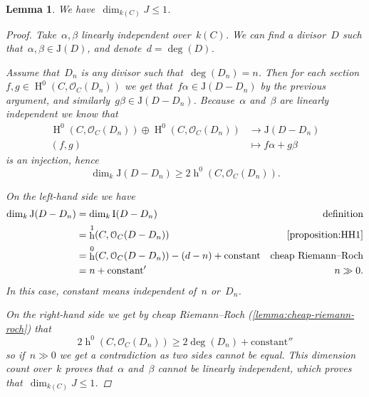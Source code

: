 \documentclass[10pt,a4paper]{article}
\theoremstyle{lecture}
\newtheorem{lemma}[theorem]{Lemma}
\DeclareMathOperator\hh{h}
\DeclareMathOperator\HH{H}
\begin{document}
\begin{lemma}
  \label{lemma:dim(J)<=1}
  We have~$\dim_{k(C)}J\leq 1$.
  \begin{proof}
    Take~$\alpha,\beta$ linearly independent over~$k(C)$. We can find a divisor~$D$ such that~$\alpha,\beta\in\mathrm{J}(D)$, and denote~$d=\deg(D)$.

    Assume that~$D_n$ is any divisor such that~$\deg(D_n)=n$. Then for each section $f,g\in\HH^0(C,\mathcal{O}_C(D_n))$ we get that~$f\alpha\in\mathrm{J}(D-D_n)$ by the previous argument, and similarly~$g\beta\in\mathrm{J}(D-D_n)$. Because~$\alpha$ and~$\beta$ are linearly independent we know that
    \begin{equation}
      \begin{aligned}
        \HH^0(C,\mathcal{O}_C(D_n))\oplus\HH^0(C,\mathcal{O}_C(D_n))&\to\mathrm{J}(D-D_n) \\
        (f,g)&\mapsto f\alpha+g\beta
      \end{aligned}
    \end{equation}
    is an injection, hence
    \begin{equation}
      \dim_k\mathrm{J}(D-D_n)\geq 2\hh^0(C,\mathcal{O}_C(D_n)).
    \end{equation}

    On the left-hand side we have
    \begin{equation}
      \begin{aligned}
        \dim_k\mathrm{J}(D-D_n)&=\dim_k\mathrm{I}(D-D_n) & \text{definition} \\
        &=\hh^1(C,\mathcal{O}_C(D-D_n)) & \text{\cref{proposition:HH1}} \\
        &=\hh^0(C,\mathcal{O}_C(D-D_n))-(d-n)+\text{constant} & \text{cheap Riemann--Roch} \\
        &=n+\text{constant}' & n\gg 0.
      \end{aligned}
    \end{equation}
    In this case, constant means independent of~$n$ or~$D_n$.

    On the right-hand side we get by cheap Riemann--Roch (\cref{lemma:cheap-riemann-roch}) that
    \begin{equation}
      2\hh^0(C,\mathcal{O}_C(D_n))\geq 2\deg(D_n)+\text{constant}''
    \end{equation}
    so if~$n\gg 0$ we get a contradiction as two sides cannot be equal. This dimension count over~$k$ proves that~$\alpha$ and~$\beta$ cannot be linearly independent, which proves that~$\dim_{k(C)}J\leq 1$.
  \end{proof}
\end{lemma}
\end{document}

